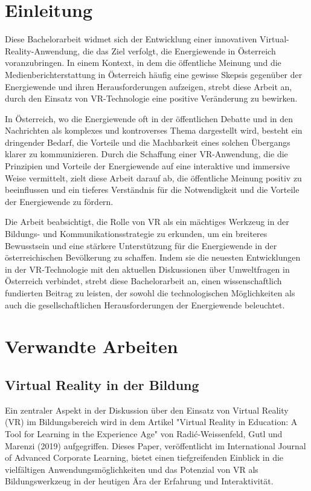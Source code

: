 \documentclass[draft,final]{vutinfth} %
\begin{document}
\tableofcontents %
\mainmatter

\chapter{Einleitung}
Diese Bachelorarbeit widmet sich der Entwicklung einer innovativen Virtual-Reality-Anwendung, die das Ziel verfolgt, die Energiewende in Österreich voranzubringen. In einem Kontext, in dem die öffentliche Meinung und die Medienberichterstattung in Österreich häufig eine gewisse Skepsis gegenüber der Energiewende und ihren Herausforderungen aufzeigen, strebt diese Arbeit an, durch den Einsatz von VR-Technologie eine positive Veränderung zu bewirken.

In Österreich, wo die Energiewende oft in der öffentlichen Debatte und in den Nachrichten als komplexes und kontroverses Thema dargestellt wird, besteht ein dringender Bedarf, die Vorteile und die Machbarkeit eines solchen Übergangs klarer zu kommunizieren. Durch die Schaffung einer VR-Anwendung, die die Prinzipien und Vorteile der Energiewende auf eine interaktive und immersive Weise vermittelt, zielt diese Arbeit darauf ab, die öffentliche Meinung positiv zu beeinflussen und ein tieferes Verständnis für die Notwendigkeit und die Vorteile der Energiewende zu fördern.

Die Arbeit beabsichtigt, die Rolle von VR als ein mächtiges Werkzeug in der Bildungs- und Kommunikationsstrategie zu erkunden, um ein breiteres Bewusstsein und eine stärkere Unterstützung für die Energiewende in der österreichischen Bevölkerung zu schaffen. Indem sie die neuesten Entwicklungen in der VR-Technologie mit den aktuellen Diskussionen über Umweltfragen in Österreich verbindet, strebt diese Bachelorarbeit an, einen wissenschaftlich fundierten Beitrag zu leisten, der sowohl die technologischen Möglichkeiten als auch die gesellschaftlichen Herausforderungen der Energiewende beleuchtet.

\chapter{Verwandte Arbeiten}

\section{Virtual Reality in der Bildung}

Ein zentraler Aspekt in der Diskussion über den Einsatz von Virtual Reality (VR) im Bildungsbereich wird in dem Artikel "Virtual Reality in Education: A Tool for Learning in the Experience Age" von Radić-Weissenfeld, Gutl und Marenzi (2019) aufgegriffen. Dieses Paper, veröffentlicht im International Journal of Advanced Corporate Learning, bietet einen tiefgreifenden Einblick in die vielfältigen Anwendungsmöglichkeiten und das Potenzial von VR als Bildungswerkzeug in der heutigen Ära der Erfahrung und Interaktivität.
\end{document}
